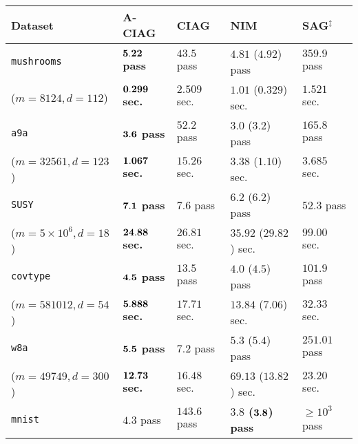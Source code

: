 \documentclass[smallextended]{svjour3}       %
\begin{document}
\begin{table}[h]
\begin{center}
\renewcommand\baselinestretch{1.25}\selectfont
{\footnotesize
\begin{tabular}{l l l l l}
\toprule
Dataset & {\sf A-CIAG}  & {\sf CIAG} & {\sf NIM}  & {\sf SAG}$^\ddagger$ %
\\
\midrule
\texttt{mushrooms} & \cellcolor{asublue!7}\bfseries $\bf 5.22$ pass & $43.5$ pass & $4.81$ ($4.92$) pass  & $359.9$ pass %
 \\
($m=8124, d = 112$) & \cellcolor{asublue!7}\bfseries $\bf 0.299$ sec. & $2.509$ sec. &  $1.01$ ($0.329$) sec. & $1.521$ sec. %
\\
\hline 
\texttt{a9a} & \cellcolor{asublue!7}\bfseries $\bf 3.6$ pass & $52.2$ pass & $3.0$ ($3.2$) pass & $165.8$ pass %
\\
($m=32561, d = 123$) & \cellcolor{asublue!7}\bfseries $\bf 1.067$ sec. & $15.26$ sec. & $3.38$ ($1.10$) sec. & $3.685$ sec.  %
\\
\hline 
\texttt{SUSY} & \cellcolor{asublue!7}\bfseries $\bf 7.1$ pass & $7.6$ pass & $6.2$ ($6.2$) pass & $52.3$ pass %
 \\
($m=5 \times 10^6, d = 18$) & \cellcolor{asublue!7}\bfseries $\bf 24.88$ sec. & $26.81$ sec. & $35.92$ ($29.82$) sec. & $99.00$ sec. %
 \\
\hline 
\texttt{covtype} & \cellcolor{asublue!7}\bfseries $\bf 4.5$ pass & $13.5$ pass & $4.0$ ($4.5$) pass & $101.9$ pass %
\\
($m=581012, d = 54$) & \cellcolor{asublue!7}\bfseries $\bf 5.888$ sec. & $17.71$ sec. & $13.84$ ($7.06$) sec. & $32.33$ sec. %
\\
\hline
\texttt{w8a} & \cellcolor{asublue!7}\bfseries $\bf 5.5$ pass &  $7.2$ pass & $5.3$ ($5.4$) pass & $251.01$ pass %
\\
($m=49749, d = 300$) & \cellcolor{asublue!7}\bfseries $\bf 12.73$ sec. & $16.48$ sec. & $69.13$ ($13.82$) sec. & $23.20$ sec. %
\\
\hline
\texttt{mnist} & $4.3$ pass &  $143.6$ pass & \cellcolor{asublue!7}\bfseries $3.8$ ($\bf 3.8$) pass & $\geq 10^3$ pass %
\\

\end{tabular}}
\end{center}
\end{table}
\end{document}
